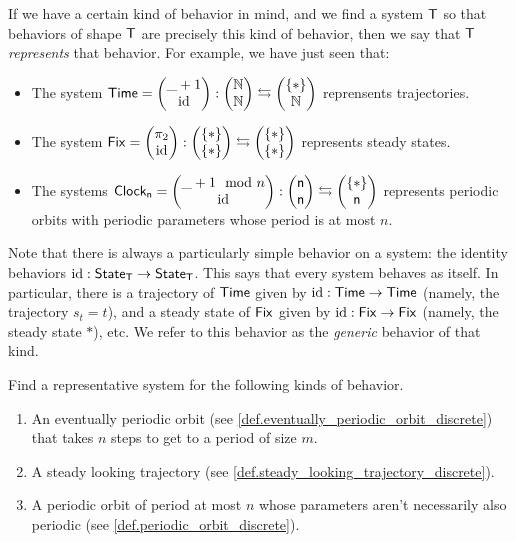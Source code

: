 \documentclass[DynamicalBook]{subfiles}
\begin{document}
If we have a certain kind of behavior in mind, and we find a system $\mathsf{T}$ so
that behaviors of shape $\mathsf{T}$ are precisely this kind of behavior, then we
say that $\mathsf{T}$ \emph{represents} that behavior. For example, we have just
seen that:
\begin{itemize}
  \item The system $\mathsf{Time} = \begin{pmatrix}{\_ + 1} \\ {\mathrm{id}} \end{pmatrix} : \begin{pmatrix}{\mathbb{N}} \\ {\mathbb{N}} \end{pmatrix} \leftrightarrows
    \begin{pmatrix}{\{\ast\}} \\ {\mathbb{N}} \end{pmatrix}$ reprensents trajectories.
  \item The system $\mathsf{Fix} = \begin{pmatrix}{\pi_2} \\ {\mathrm{id}} \end{pmatrix} : \begin{pmatrix}{\{\ast\}} \\ {\{\ast\}} \end{pmatrix}
    \leftrightarrows \begin{pmatrix}{\{\ast\}} \\ {\{\ast\}} \end{pmatrix}$ represents steady states.
  \item The systems $\mathsf{Clock_n} = \begin{pmatrix}{\_ + 1 \mod n} \\ {\mathrm{id}} \end{pmatrix} :
    \begin{pmatrix}{\mathsf{n}} \\ {\mathsf{n}} \end{pmatrix} \leftrightarrows \begin{pmatrix}{\{\ast\}} \\ {\mathsf{n}} \end{pmatrix}$
    represents periodic orbits with periodic parameters whose period is at most $n$.
\end{itemize}

Note that there is always a particularly simple behavior on a system: the
identity behaviors $\mathrm{id} : \mathsf{State}_{\mathsf{T}} \to \mathsf{State}_{\mathsf{T}}$. This says that every system
behaves as itself. In particular, there is a trajectory of $\mathsf{Time}$ given by
$\mathrm{id} : \mathsf{Time} \to \mathsf{Time}$ (namely, the trajectory $s_t = t$), and a
steady state of $\mathsf{Fix}$ given by $\mathrm{id} : \mathsf{Fix} \to \mathsf{Fix}$ (namely,
the steady state $\ast$), etc. We refer to this behavior as the \emph{generic}
behavior of that kind.

\begin{exercise}\label{ex.find_representatives_discrete}
  Find a representative system for the following kinds of behavior.
  \begin{enumerate}
    \item An eventually periodic orbit (see \cref{def.eventually_periodic_orbit_discrete}) that takes $n$ steps to get to a period
      of size $m$.
    \item A steady looking trajectory (see \cref{def.steady_looking_trajectory_discrete}).
    \item A periodic orbit of period at most $n$ whose parameters aren't
      necessarily also periodic (see \cref{def.periodic_orbit_discrete}).
  \end{enumerate}
\end{exercise}
\end{document}
